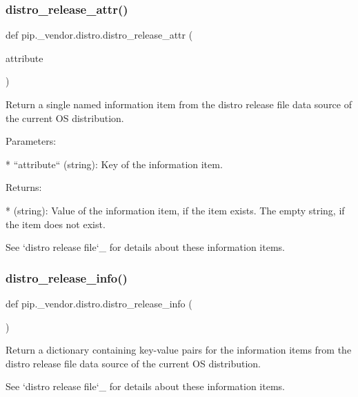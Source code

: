 \subsubsection{\texorpdfstring{distro\+\_\+release\+\_\+attr()}{distro\_release\_attr()}}
{\footnotesize\ttfamily def pip.\+\_\+vendor.\+distro.\+distro\+\_\+release\+\_\+attr (\begin{DoxyParamCaption}\item[{}]{attribute }\end{DoxyParamCaption})}

\begin{DoxyVerb}Return a single named information item from the distro release file
data source of the current OS distribution.

Parameters:

* ``attribute`` (string): Key of the information item.

Returns:

* (string): Value of the information item, if the item exists.
  The empty string, if the item does not exist.

See `distro release file`_ for details about these information items.
\end{DoxyVerb}
 \mbox{\label{namespacepip_1_1__vendor_1_1distro_aaf9998b3f35ded1bcc91d2e50884035c}} 
\subsubsection{\texorpdfstring{distro\+\_\+release\+\_\+info()}{distro\_release\_info()}}
{\footnotesize\ttfamily def pip.\+\_\+vendor.\+distro.\+distro\+\_\+release\+\_\+info (\begin{DoxyParamCaption}{ }\end{DoxyParamCaption})}

\begin{DoxyVerb}Return a dictionary containing key-value pairs for the information items
from the distro release file data source of the current OS distribution.

See `distro release file`_ for details about these information items.
\end{DoxyVerb}
 \mbox{\label{namespacepip_1_1__vendor_1_1distro_a9a240f009c8550ce7857b788d952c653}} 
